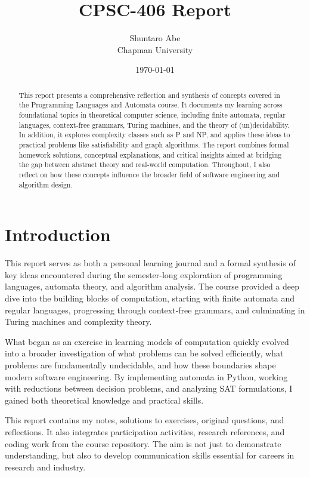 \documentclass{article}
\title{CPSC-406 Report}
\author{Shuntaro Abe  \\ Chapman University}
\date{\today}
\theoremstyle{theorem}
\theoremstyle{definition}
\theoremstyle{remark}
\begin{document}
\maketitle

\begin{abstract}
  This report presents a comprehensive reflection and synthesis of concepts covered in the Programming Languages and Automata course. It documents my learning across foundational topics in theoretical computer science, including finite automata, regular languages, context-free grammars, Turing machines, and the theory of (un)decidability. In addition, it explores complexity classes such as P and NP, and applies these ideas to practical problems like satisfiability and graph algorithms. The report combines formal homework solutions, conceptual explanations, and critical insights aimed at bridging the gap between abstract theory and real-world computation. Throughout, I also reflect on how these concepts influence the broader field of software engineering and algorithm design.
\end{abstract}

\setcounter{tocdepth}{3}
\tableofcontents

\section{Introduction}\label{intro}
This report serves as both a personal learning journal and a formal synthesis of key ideas encountered during the semester-long exploration of programming languages, automata theory, and algorithm analysis. The course provided a deep dive into the building blocks of computation, starting with finite automata and regular languages, progressing through context-free grammars, and culminating in Turing machines and complexity theory.

What began as an exercise in learning models of computation quickly evolved into a broader investigation of what problems can be solved efficiently, what problems are fundamentally undecidable, and how these boundaries shape modern software engineering. By implementing automata in Python, working with reductions between decision problems, and analyzing SAT formulations, I gained both theoretical knowledge and practical skills.

This report contains my notes, solutions to exercises, original questions, and reflections. It also integrates participation activities, research references, and coding work from the course repository. The aim is not just to demonstrate understanding, but also to develop communication skills essential for careers in research and industry.
\end{document}
